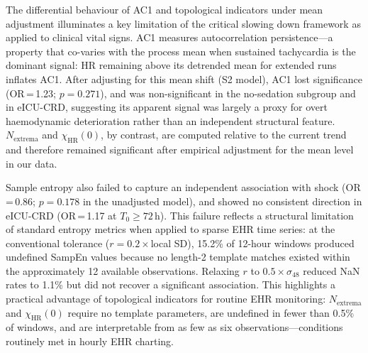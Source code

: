 \documentclass[12pt,a4paper]{article}
\begin{document}
The differential behaviour of AC1 and topological indicators under mean
adjustment illuminates a key limitation of the critical slowing down
framework as applied to clinical vital signs.
AC1 measures autocorrelation persistence---a property that co-varies with
the process mean when sustained tachycardia is the dominant signal: HR
remaining above its detrended mean for extended runs inflates AC1.
After adjusting for this mean shift (S2 model), AC1 lost significance
(OR\,=\,1.23; $p=0.271$), and was non-significant in the no-sedation
subgroup and in eICU-CRD, suggesting its apparent signal was largely
a proxy for overt haemodynamic deterioration rather than an independent
structural feature.
$N_{\text{extrema}}$ and $\chi_{\text{HR}}(0)$, by contrast, are computed
relative to the current trend and therefore remained significant after
empirical adjustment for the mean level in our data.

Sample entropy also failed to capture an independent association with
shock (OR\,=\,0.86; $p=0.178$ in the unadjusted model), and showed no
consistent direction in eICU-CRD (OR\,=\,1.17 at $T_0\geq 72$\,h).
This failure reflects a structural limitation of standard entropy metrics
when applied to sparse EHR time series: at the conventional tolerance
($r=0.2\times$local SD), 15.2\% of 12-hour windows produced undefined
SampEn values because no length-2 template matches existed within the
approximately 12 available observations.
Relaxing $r$ to $0.5\times\sigma_{48}$ reduced NaN rates to 1.1\% but
did not recover a significant association.
This highlights a practical advantage of topological indicators for routine
EHR monitoring: $N_{\text{extrema}}$ and $\chi_{\text{HR}}(0)$ require no
template parameters, are undefined in fewer than 0.5\% of windows, and are
interpretable from as few as six observations---conditions routinely met
in hourly EHR charting.
\end{document}
